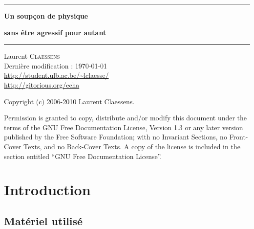 \documentclass[a4paper,12pt]{book}
\theoremstyle{mes_exemples}	\newtheorem{exemple}[numtho]{Exemple}
\theoremstyle{mes_tho}
\begin{document}

%

\thispagestyle{empty}
\begin{center}
  \begin{minipage}{15cm}
    \hrule\par
    \vspace{2mm}
    \begin{center}
    \Huge \bfseries Un soupçon de physique  \par
    \Huge \bfseries sans être agressif pour autant \par
    \end{center}
    \hrule\par
  \end{minipage}
\end{center}

\vfill\vfill
\null\hfill Laurent \textsc{Claessens}\\
\null\hfill Dernière modification : \today\\
\null\hfill \url{http://student.ulb.ac.be/~lclaesse/}\\
\null\hfill \url{http://gitorious.org/echa}

\newpage

Copyright (c) 2006-2010  Laurent Claessens.

Permission is granted to copy, distribute and/or modify this document under the terms of the GNU Free Documentation License, Version 1.3 or any later version published by the Free Software Foundation; with no Invariant Sections, no Front-Cover Texts, and no Back-Cover Texts. A copy of the license is included in the section entitled ``GNU Free Documentation License''.




\tableofcontents

\chapter{Introduction}

\section{Matériel utilisé}
\end{document}

